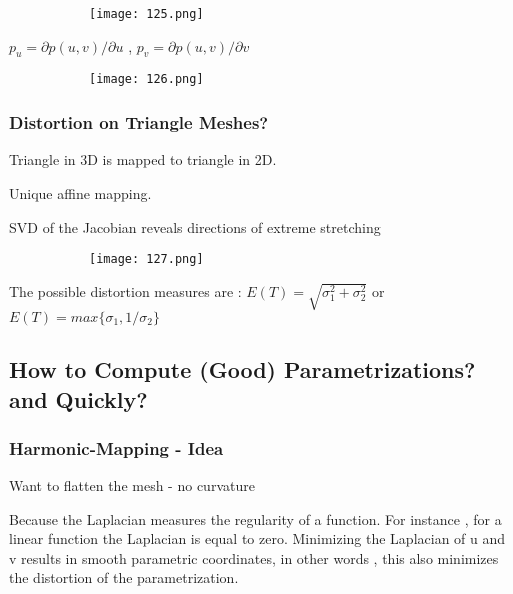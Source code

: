 \documentclass{article}
\begin{document}
    \begin{figure}[ht!]
  \centering
  \begin{subfigure}[b]{0.5\linewidth}
    \texttt{[image: 125.png]}
  \end{subfigure}
\end{figure}

$p_u = \partial p(u,v) / \partial u$ , $p_v = \partial p(u,v) / \partial v$ 

    \begin{figure}[ht!]
  \centering
  \begin{subfigure}[b]{0.7\linewidth}
    \texttt{[image: 126.png]}
  \end{subfigure}
\end{figure}

\subsubsection{Distortion on Triangle Meshes?}

Triangle in 3D is mapped to triangle in 2D.

Unique affine mapping.

SVD of the Jacobian reveals directions of extreme stretching

    \begin{figure}[ht!]
  \centering
  \begin{subfigure}[b]{0.5\linewidth}
    \texttt{[image: 127.png]}
  \end{subfigure}
\end{figure}

The possible distortion measures are : $E(T) = \sqrt{\sigma_1^2 + \sigma_2^2}$ or $E(T) = max\{\sigma_1 , 1/\sigma_2\}$

\subsection{How to Compute (Good) Parametrizations? and Quickly?}

\subsubsection{Harmonic-Mapping - Idea}

Want to flatten the mesh - no curvature 

Because the Laplacian measures the regularity of a function. For instance , for a linear function the Laplacian is equal to zero. Minimizing the Laplacian of u and v results in smooth parametric coordinates, in other words , this also minimizes the distortion of the parametrization.
\end{document}
